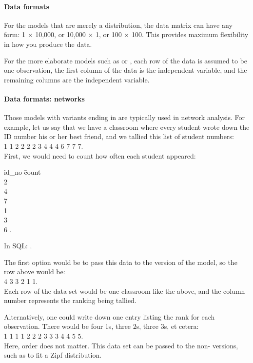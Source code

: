 \paragraph{Data formats} \label{dataformats} 
For the models that are merely a distribution, the data matrix can have
any form: 1 $\times$ 10,000, or 10,000 $\times$ 1, or 100 $\times$ 100.
This provides maximum flexibility in how you produce the data.

For the more elaborate models such as  or
, each row of the data is assumed to be one
observation, the first column of the data is the independent
variable, and the remaining columns are the independent variable.

\paragraph{\treesymbol{} Data formats: networks} 
Those models with variants ending in  are typically used
in network analysis. For example, let us say that we have a classroom
where every student wrote down the ID number his or her best friend,
and we tallied this list of student numbers:\\
1 1 2 2 2 2 3 4 4 4 6 7 7 7.\\ 
First, we would need to count how often each student appeared:\\

\begin{tabbing}
id\_no \= count\\
2 \\
4 \\
7 \\
1 \\
3 \\
6 .
\end{tabbing}
In SQL: .

The first option would be to pass this data to
the  version of the model, so the row above would be:\\
4 3 3 2 1 1.\\
Each row of the data set would be one classroom like the above, and the
column number represents the ranking being tallied.

Alternatively, one could 
write down one entry listing the rank for each observation. There would
be four 1s, three 2s, three 3s, et cetera:\\
1 1 1 1 2 2 2 3 3 3 4 4 5 5.\\
Here, order does not matter.  This data set can be passed to the
non- versions, such as  to fit a
Zipf distribution.

